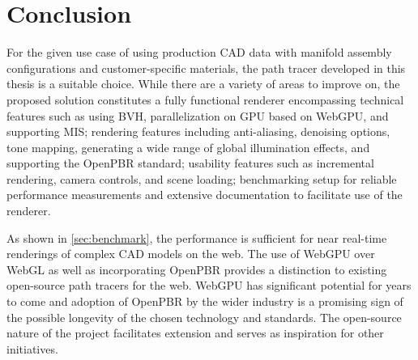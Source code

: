 \section{Conclusion}

For the given use case of using production \gls{CAD} data with manifold assembly configurations and customer-specific materials, the path tracer developed in this thesis is a suitable choice. While there are a variety of areas to improve on, the proposed solution constitutes a fully functional renderer encompassing technical features such as using \gls{BVH}, parallelization on \gls{GPU} based on \gls{WebGPU}, and supporting \gls{MIS}; rendering features including anti-aliasing, denoising options, tone mapping, generating a wide range of global illumination effects, and supporting the \gls{OpenPBR} standard; usability features such as incremental rendering, camera controls, and scene loading; benchmarking setup for reliable performance measurements and extensive documentation to facilitate use of the renderer.

As shown in \autoref{sec:benchmark}, the performance is sufficient for near real-time renderings of complex \gls{CAD} models on the web. The use of \gls{WebGPU} over \gls{WebGL} as well as incorporating \gls{OpenPBR} provides a distinction to existing open-source path tracers for the web. \gls{WebGPU} has significant potential for years to come and adoption of \gls{OpenPBR} by the wider industry is a promising sign of the possible longevity of the chosen technology and standards. The open-source nature of the project facilitates extension and serves as inspiration for other initiatives.
